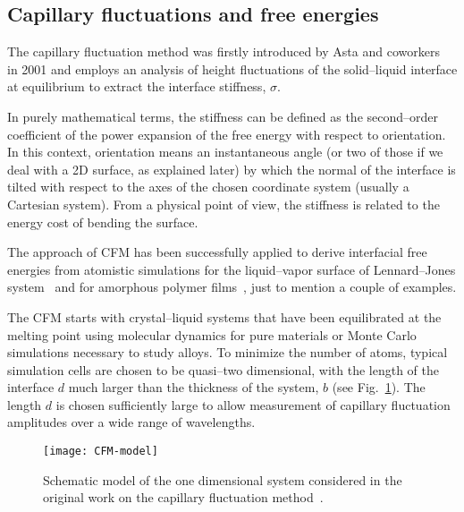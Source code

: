 








\subsection{Capillary fluctuations and free energies\label{sec:CFM}}

The capillary fluctuation method was firstly introduced by Asta and coworkers~\cite{HoytPRL2001:CFM} in 2001 and employs an analysis of height fluctuations
of the solid--liquid interface at equilibrium to extract the interface stiffness, $\sigma$.

In purely mathematical terms, the stiffness can be defined as the second--order coefficient of the power expansion of the free energy with respect to orientation. In this context, orientation means an instantaneous angle (or two of those if we deal with a 2D surface, as explained later) by which the normal of the interface is tilted with respect to the axes of the chosen coordinate system (usually a Cartesian system). From a physical point of view, the stiffness is related to the energy cost of bending the surface.

The approach of CFM has been successfully applied to derive interfacial free energies from atomistic simulations for the liquid--vapor surface of Lennard--Jones system~\cite{Sides1999:HoytREVIEW43} and for amorphous polymer films~\cite{Hapke1998:HoytREVIEW44}, just to mention a couple of examples.

The CFM starts with crystal–liquid systems that have been equilibrated at the melting point
using molecular dynamics for pure materials or Monte Carlo simulations necessary to study alloys. To minimize the number of atoms, typical simulation cells are chosen to be quasi--two dimensional, with the length of the interface $d$ much larger than the thickness of the system, $b$ (see Fig.~\ref{fig:CFM_model}). The length $d$ is chosen sufficiently large to allow measurement of capillary fluctuation amplitudes over a wide range of wavelengths.
\begin{figure}[bt]
    \centering
    \texttt{[image: CFM-model]}
    \caption{Schematic model of the one dimensional system considered in the original work on the capillary fluctuation method~\cite{Hoyt2003CFMReview}.}
    \label{fig:CFM_model}
\end{figure}

